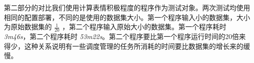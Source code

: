 \documentclass[12pt, oneside]{article}
\begin{document}
\begin{spacing}{1.5}
\begin{CJK}{UTF8}{gbsn}
第二部分的对比我们使用计算表情积极程度的程序作为测试对象。两次测试均使用相同的配置部署，不同的是使用的数据集大小。第一个程序输入小的数据集，大小为原始数据集的 $\frac{1}{20}$ ，第二个程序输入原始大小的数据集。第一个程序耗时 {\it 3m46s}，第二个程序耗时 {\it 53m22s}。第二个程序要比第一个程序运行时间的20倍来得少，这种关系说明有一些调度管理的任务所消耗的时间要比数据集的增长来的缓慢。

\newpage
\renewcommand\refname{参考文献}



\end{CJK}
\end{spacing}
\end{document}
